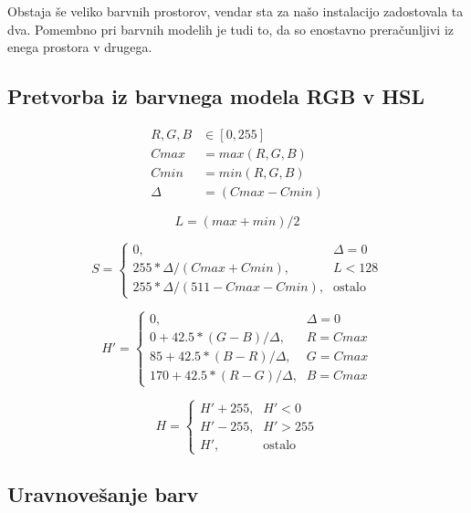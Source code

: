 \documentclass[a4paper, 12pt]{book}
\begin{document}
Obstaja še veliko barvnih prostorov, vendar sta za našo instalacijo
zadostovala ta dva. Pomembno pri barvnih modelih je tudi to, da so enostavno
preračunljivi iz enega prostora v drugega.


\subsection{Pretvorba iz barvnega modela RGB v HSL}
\label{sec:hslconvert}

\begin{align}
R, G, B &\in [0,255] \nonumber \\
Cmax &= max(R, G, B) \\
Cmin &= min(R, G, B) \\
\Delta &= (Cmax - Cmin)
\end{align}

\begin{equation}
L = (max + min) / 2 \label{eq:hsl_l}
\end{equation}

\begin{equation}
S =
\begin{cases}
    0 \text{,}& \Delta = 0 \\
    255 * \Delta / (Cmax + Cmin) \text{,}& L < 128 \\
    255 * \Delta / (511 - Cmax - Cmin) \text{,}& \text{ostalo}
\end{cases}
\end{equation}

\begin{equation}
H' =
\begin{cases}
    0 \text{,}& \Delta = 0 \\
    0 + 42.5 * (G - B) / \Delta \text{,}& R = Cmax \\
    85 + 42.5 * (B - R) / \Delta \text{,}& G = Cmax \\
    170 + 42.5 * (R - G) / \Delta \text{,}& B = Cmax
\end{cases}
\end{equation}

\begin{equation}
H =
\begin{cases}
    H' + 255 \text{,}& H' < 0 \\
    H' - 255 \text{,}& H' > 255 \\
    H' \text{,}& \text{ostalo}
\end{cases}
\end{equation}


\subsection{Uravnovešanje barv}
\label{sec:obdelavaSlikUravnovesanjeBarv}
\end{document}
